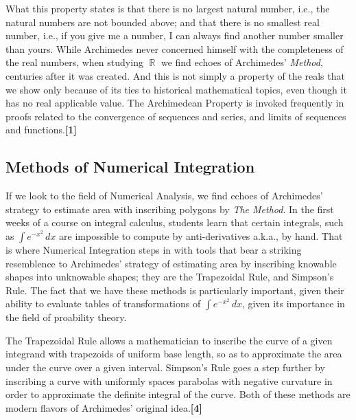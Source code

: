 \documentclass[letterpaper, 12pt]{amsart}
\DeclareMathOperator{\R}{\mathbb{R}}
\theoremstyle{definition}  %
\begin{document}
		What this property states is that there is no largest natural number, i.e., the natural numbers are not bounded above; and that there is no smallest real number, i.e., if you give me a number, I can always find another number smaller than yours.
		While Archimedes never concerned himself with the completeness of the real numbers, when studying $\R$ we find echoes of Archimedes' \textit{Method}, centuries after it was created.
		And this is not simply a property of the reals that we show only because of its ties to historical mathematical topics, even though it has no real applicable value.
		The Archimedean Property is invoked frequently in proofs related to the convergence of sequences and series, and limits of sequences and functions.\textbf{[1]}

		\subsection{Methods of Numerical Integration}
		\label{sub:methods_of_numerical_integration}
		If we look to the field of Numerical Analysis, we find echoes of Archimedes' strategy to estimate area with inscribing polygons by \textit{The Method}.
		In the first weeks of a course on integral calculus, students learn that certain integrals, such as $\int e^{-x^{2}} \, dx$ are impossible to compute by anti-derivatives a.k.a., by hand.
		That is where Numerical Integration steps in with tools that bear a striking resemblence to Archimedes' strategy of estimating area by inscribing knowable shapes into unknowable shapes; they are the Trapezoidal Rule, and Simpson's Rule.
		The fact that we have these methods is particularly important, given their ability to evaluate tables of transformations of $\int e^{-x^{2}} \, dx$, given its importance in the field of proability theory.

		The Trapezoidal Rule allows a mathematician to inscribe the curve of a given integrand with trapezoids of uniform base length, so as to approximate the area under the curve over a given interval.
		Simpson's Rule goes a step further by inscribing a curve with uniformly spaces parabolas with negative curvature in order to approximate the definite integral of the curve.
		Both of these methods are modern flavors of Archimedes' original idea.\textbf{[4]}
\end{document}
